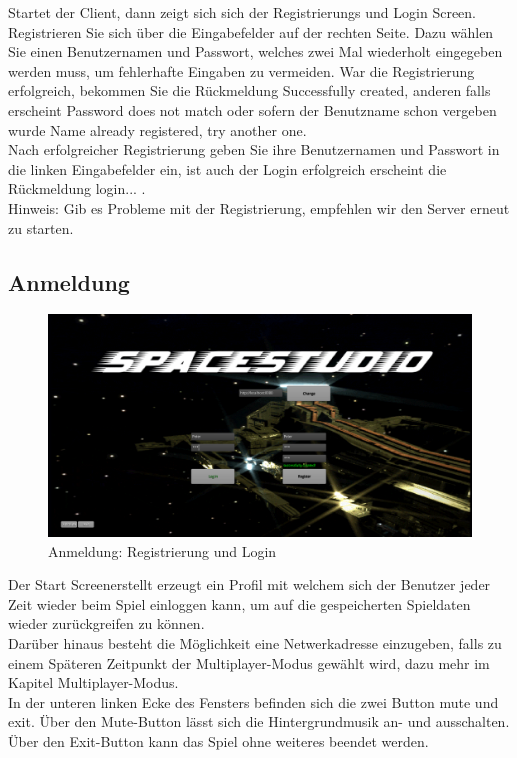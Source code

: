 \documentclass[fontsize=12pt,paper=a4,twoside]{scrartcl}
\begin{document}
Startet der Client, dann zeigt sich sich der Registrierungs und Login Screen.
Registrieren Sie sich über die Eingabefelder auf der rechten Seite. Dazu wählen Sie einen Benutzernamen und Passwort, welches zwei Mal wiederholt eingegeben werden muss, um fehlerhafte Eingaben zu vermeiden.
War die Registrierung erfolgreich, bekommen Sie die Rückmeldung Successfully created, anderen falls erscheint Password does not match oder sofern der Benutzname schon vergeben wurde Name already
registered, try another one.\\
Nach erfolgreicher Registrierung geben Sie ihre Benutzernamen und Passwort in die linken Eingabefelder ein, ist auch der Login erfolgreich erscheint die Rückmeldung login... .\\

Hinweis: Gib es Probleme mit der Registrierung, empfehlen wir den Server erneut zu starten.

\subsection{Anmeldung}
\begin{figure}[htp]
\centering
	\includegraphics[width=1.00\linewidth]{pics/StartScreen01.png}
	\caption{Anmeldung: Registrierung und Login}
	\label{fig1}
\end{figure}

Der Start Screenerstellt erzeugt ein Profil mit welchem sich der Benutzer jeder Zeit wieder beim Spiel einloggen kann, um auf die gespeicherten Spieldaten wieder zurückgreifen zu können. \\
Darüber hinaus besteht die Möglichkeit eine Netwerkadresse einzugeben, falls zu einem Späteren Zeitpunkt der Multiplayer-Modus gewählt wird, dazu mehr im Kapitel Multiplayer-Modus.\\
In der unteren linken Ecke des Fensters befinden sich die zwei Button mute und exit. Über den Mute-Button lässt sich die Hintergrundmusik an- und ausschalten. 
Über den Exit-Button kann das Spiel ohne weiteres beendet werden.
\end{document}
